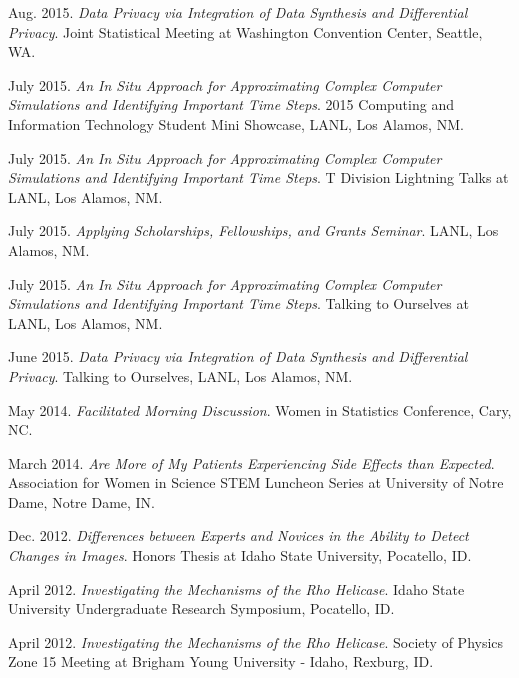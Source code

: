 \begin{etaremune}[topsep=0pt, itemsep=3pt, partopsep=0pt, parsep=0pt]
    \item Aug. 2015. \textit{Data Privacy via Integration of Data Synthesis and Differential Privacy}. Joint Statistical Meeting at Washington Convention Center, Seattle, WA.
    
    \item July 2015. \textit{An In Situ Approach for Approximating Complex Computer Simulations and Identifying Important Time Steps}. 2015 Computing and Information Technology Student Mini Showcase, LANL, Los Alamos, NM.
    
    \item July 2015. \textit{An In Situ Approach for Approximating Complex Computer Simulations and Identifying Important Time Steps}. T Division Lightning Talks at LANL, Los Alamos, NM.
    
    \item July 2015. \textit{Applying Scholarships, Fellowships, and Grants Seminar}. LANL, Los Alamos, NM.
    
    \item July 2015. \textit{An In Situ Approach for Approximating Complex Computer Simulations and Identifying Important Time Steps}. Talking to Ourselves at LANL, Los Alamos, NM.
    
    \item June 2015. \textit{Data Privacy via Integration of Data Synthesis and Differential Privacy}. Talking to Ourselves, LANL, Los Alamos, NM. 
    
    \item May 2014. \textit{Facilitated Morning Discussion}. Women in Statistics Conference, Cary, NC.
    
    \item March 2014. \textit{Are More of My Patients Experiencing Side Effects than Expected}. Association for Women in Science STEM Luncheon Series at University of Notre Dame, Notre Dame, IN.
    
    \item Dec. 2012. \textit{Differences between Experts and Novices in the Ability to Detect Changes in Images}. Honors Thesis at Idaho State University, Pocatello, ID.
    
    \item April 2012. \textit{Investigating the Mechanisms of the Rho Helicase}. Idaho State University Undergraduate Research Symposium, Pocatello, ID.
    
    \item April 2012. \textit{Investigating the Mechanisms of the Rho Helicase}. Society of Physics Zone 15 Meeting at Brigham Young University - Idaho, Rexburg, ID.
    

\end{etaremune}
